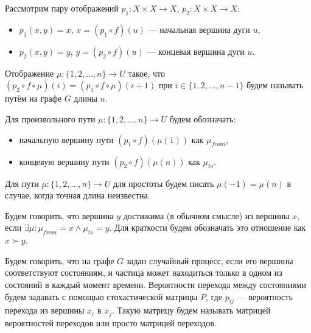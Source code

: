 \begin{definition}
	Рассмотрим пару отображений $p_1:X \times X\to X$, $p_2:X \times X\to X$:
	\begin{itemize}
		\item $p_1(x, y) = x$, $x = (p_1 \circ f)(u)$ --- начальная вершина дуги $u$,
		\item $p_2(x, y) = y$, $y = (p_2 \circ f)(u)$ --- концевая вершина дуги $u$.
	\end{itemize}
\end{definition}

\begin{definition}
	Отображение $\mu:\{1, 2, ... , n\} \to U$ такое, что 
	$(p_2 \circ f \circ \mu)(i) = (p_1 \circ f \circ \mu)(i + 1)$ при $i \in \{1, 2, ... , n-1\}$
	будем называть путём на графе $G$ длины $n$.
\end{definition}

\begin{definition}
	Для произвольного пути $\mu:\{1, 2, ... , n\} \to U$ будем обозначать:
	\begin{itemize}
		\item начальную вершину пути $(p_1 \circ f)(\mu(1))$ как $\mu_{from}$,
		\item концевую вершину пути $(p_2 \circ f)(\mu(n))$ как $\mu_{to}$.
	\end{itemize}
\end{definition}

\begin{definition}
	Для пути $\mu:\{1, 2, ... , n\} \to U$ для простоты будем писать $\mu(-1) = \mu(n)$ в случае, когда точная длина неизвестна. 
\end{definition}

\begin{definition}
	Будем говорить, что вершина $y$ достижима (в обычном смысле) из вершины $x$, если $\exists \mu: \mu_{from} = x \wedge \mu_{to} = y$. Для краткости будем обозначать это отношение как $x \succ y$.
\end{definition}


\begin{definition}
	Будем говорить, что на графе $G$ задан случайный процесс, если его вершины соответствуют состояниям, и частица может находиться только в одном из состояний в каждый момент времени. Вероятности перехода между состояниями будем задавать с помощью стохастической матрицы $P$, где $p_{ij}$ --- вероятность перехода из вершины $x_i$ в $x_j$. Такую матрицу будем называть матрицей вероятностей переходов или просто матрицей переходов.
\end{definition}

